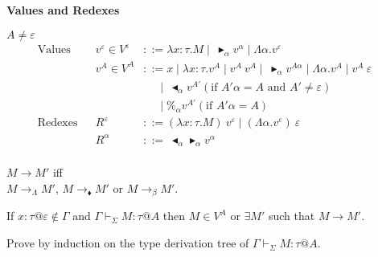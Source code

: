 \documentclass[9pt, a4paper]{extarticle}
\theoremstyle{break}
\newcommand{\figheader}[2]{
  \begin{flushleft}
    #2 {\bf \normalsize #1}
\end{flushleft}}
\newcommand{\G}{\Gamma}
\newcommand{\V}{\vdash_\Sigma}
\newcommand{\TB}{\blacktriangleright}
\newcommand{\TBL}{\blacktriangleleft}
\begin{document}
\figheader{Values and Redexes}{}
$A \neq \varepsilon$\\
\begin{align*}
	\textrm{Values}                              &   & v^\varepsilon \in V^\varepsilon & ::= \lambda x:\tau.M \mid\ \TB_\alpha v^\alpha \mid \Lambda\alpha.v^\varepsilon              & \\
	                                             &   & v^A \in V^A                     & ::= x \mid \lambda x:\tau.v^A \mid v^A\ v^A \mid\ \TB_\alpha v^{A\alpha}
	\mid \Lambda\alpha.v^A \mid v^A\ \varepsilon &                                                                                                                                      \\
	                                             &   &                                 & \quad\   \mid\ \TBL_\alpha v^{A'} (\text{if } A'\alpha = A \text{ and } A' \neq \varepsilon) & \\
	                                             &   &                                 & \quad\   \mid \%_\alpha v^{A'} (\text{if } A'\alpha = A)                                     & \\
	\textrm{Redexes}                             &   & R^\varepsilon                   & ::= (\lambda x:\tau.M)\ v^\varepsilon \mid (\Lambda\alpha.v^\varepsilon)\ \varepsilon        & \\
	                                             &   & R^\alpha                        & ::=\ \TBL_\alpha \TB_\alpha v^\alpha                                                         & \\
\end{align*}

\begin{dfn}[Reduction]
	$ M \longrightarrow M'$ iff \\
	$ M \longrightarrow_\Lambda M' $, $ M \longrightarrow_\blacklozenge M' $ or $ M \longrightarrow_\beta M' $.
\end{dfn}

\begin{thm}[Progress]
	If $x:\tau@\varepsilon \notin \G$ and $\G \V M : \tau @ A$ then $ M \in V^A $ or $\exists M'$ such that $M \longrightarrow M'$.
\end{thm}

Prove by induction on the type derivation tree of $\G \V M:\tau@A$.
\end{document}
